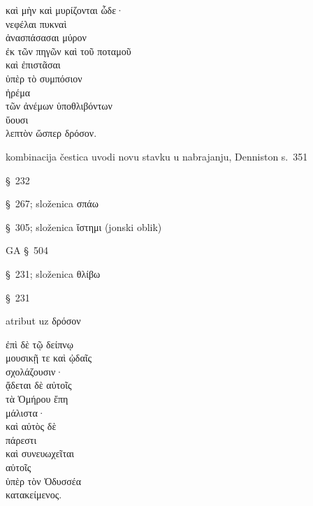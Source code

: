 

{\large
\begin{greek}
\noindent καὶ μὴν καὶ μυρίζονται ὧδε· \\
νεφέλαι πυκναὶ \\
\tabto{2em} ἀνασπάσασαι μύρον \\
\tabto{4em} ἐκ τῶν πηγῶν καὶ τοῦ ποταμοῦ \\
\tabto{2em} καὶ ἐπιστᾶσαι \\
\tabto{4em} ὑπὲρ τὸ συμπόσιον \\
ἠρέμα \\
\tabto{2em} τῶν ἀνέμων ὑποθλιβόντων \\
ὕουσι \\
λεπτὸν ὥσπερ δρόσον.\\

\end{greek}
}

\begin{description}[noitemsep]
\item[καὶ μὴν καὶ] kombinacija čestica uvodi novu stavku u nabrajanju, Denniston s.~351
\item[μυρίζονται] §~232
\item[ἀνασπάσασαι] §~267; složenica σπάω
\item[ἐπιστᾶσαι] §~305; složenica ἵστημι (jonski oblik)
\item[τῶν ἀνέμων ὑποθλιβόντων] GA §~504
\item[ὑποθλιβόντων] §~231; složenica θλίβω
\item[ὕουσι] §~231
\item[λεπτὸν] atribut uz δρόσον
\end{description}




{\large
\begin{greek}
\noindent ἐπὶ δὲ τῷ δείπνῳ \\
\tabto{2em} μουσικῇ τε καὶ ᾠδαῖς \\
σχολάζουσιν· \\
ᾄδεται δὲ αὐτοῖς \\
τὰ Ὁμήρου ἔπη \\
\tabto{2em} μάλιστα· \\
καὶ αὐτὸς δὲ \\
πάρεστι \\
καὶ συνευωχεῖται \\
\tabto{2em} αὐτοῖς \\
\tabto{2em} ὑπὲρ τὸν Ὀδυσσέα \\
κατακείμενος. \\

\end{greek}
}

